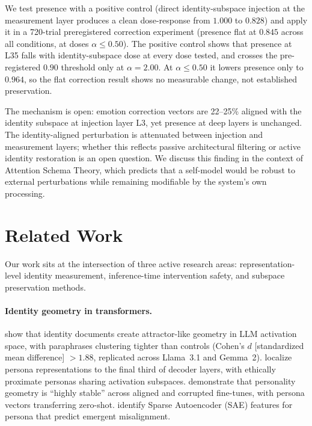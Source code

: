 \documentclass[11pt,a4paper]{article}
\begin{document}
We test presence with a positive control (direct identity-subspace
injection at the measurement layer produces a clean dose-response from
$1.000$ to $0.828$) and apply it in a 720-trial preregistered correction
experiment (presence flat at $0.845$ across all conditions, at doses
$\alpha \le 0.50$). The positive control shows that presence at L35
falls with identity-subspace dose at every dose tested, and crosses the
pre-registered $0.90$ threshold only at $\alpha = 2.00$. At
$\alpha \le 0.50$ it lowers presence only to $0.964$, so the flat
correction result shows no measurable change, not established
preservation.

The mechanism is open: emotion correction vectors are 22--25\%
aligned with the identity subspace at injection layer L3, yet presence at
deep layers is unchanged. The identity-aligned perturbation is attenuated
between injection and measurement layers; whether this reflects passive
architectural filtering or active identity restoration is an open question.
We discuss this finding in the context of Attention Schema Theory, which
predicts that a self-model would be robust to external perturbations while
remaining modifiable by the system's own processing.

\section{Related Work}
\label{sec:related}

Our work sits at the intersection of three active research areas:
representation-level identity measurement, inference-time intervention
safety, and subspace preservation methods.

\paragraph{Identity geometry in transformers.}
\citet{vasilenko2026identity} show that identity documents create
attractor-like geometry in LLM activation space, with paraphrases clustering
tighter than controls (Cohen's $d$ [standardized mean difference] $> 1.88$, replicated across Llama~3.1 and
Gemma~2). \citet{cintas2025localizing} localize persona representations to
the final third of decoder layers, with ethically proximate personas sharing
activation subspaces. \citet{aneja2026intrinsic} demonstrate that personality
geometry is ``highly stable'' across aligned and corrupted fine-tunes, with
persona vectors transferring zero-shot. \citet{wang2025persona} identify
Sparse Autoencoder (SAE) features for persona that predict emergent misalignment.
\end{document}

